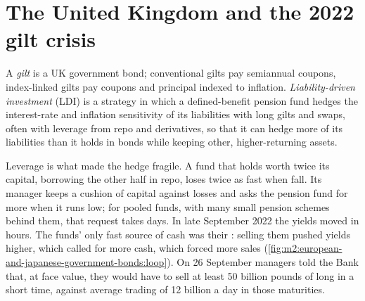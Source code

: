 \section{The United Kingdom and the 2022 gilt crisis}

\begin{definition}\label{def:m2:european-and-japanese-government-bonds:ldi}
A \emph{gilt} is a UK government bond; conventional gilts pay
semiannual coupons, index-linked gilts pay coupons and principal indexed to
inflation. \emph{Liability-driven investment} (LDI) is a strategy in which a defined-benefit pension fund
hedges the interest-rate and inflation sensitivity of its liabilities with
long gilts and swaps, often with leverage from repo and derivatives, so that it
can hedge more of its liabilities than it holds in bonds while keeping other,
higher-returning assets.
\end{definition}

Leverage is what made the hedge fragile. A fund that holds  worth twice
its capital, borrowing the other half in repo, loses twice as fast when 
fall. Its manager keeps a cushion of capital against losses and asks the
pension fund for more when it runs low; for pooled funds, with many small
pension schemes behind them, that request takes days. In late September 2022
the yields moved in hours. The funds' only fast source of cash was their :
selling them pushed yields higher, which called for more cash, which forced
more sales (\cref{fig:m2:european-and-japanese-government-bonds:loop}). On 26
September managers told the Bank that, at face value, they would have to sell
at least 50 billion pounds of long  in a short time, against average
trading of 12 billion a day in those maturities.

